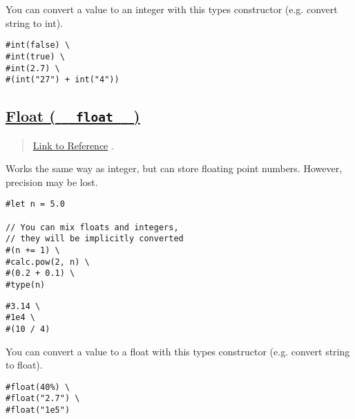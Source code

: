 You can convert a value to an integer with this type\textquotesingle s
constructor (e.g. convert string to int).

\begin{verbatim}
#int(false) \
#int(true) \
#int(2.7) \
#(int("27") + int("4"))
\end{verbatim}

\pandocbounded{}

\subsection{\texorpdfstring{\hyperref[float-float]{Float (
\texttt{\ }{\texttt{\ float\ }}\texttt{\ }
)}}{Float (   float   )}}\label{float-float}

\begin{quote}
\href{https://typst.app/docs/reference/foundations/float/}{Link to
Reference} .
\end{quote}

Works the same way as integer, but can store floating point numbers.
However, precision may be lost.

\begin{verbatim}
#let n = 5.0

// You can mix floats and integers, 
// they will be implicitly converted
#(n += 1) \
#calc.pow(2, n) \
#(0.2 + 0.1) \
#type(n) 
\end{verbatim}

\pandocbounded{}

\begin{verbatim}
#3.14 \
#1e4 \
#(10 / 4)
\end{verbatim}

\pandocbounded{}

You can convert a value to a float with this type\textquotesingle s
constructor (e.g. convert string to float).

\begin{verbatim}
#float(40%) \
#float("2.7") \
#float("1e5")
\end{verbatim}

\pandocbounded{}

